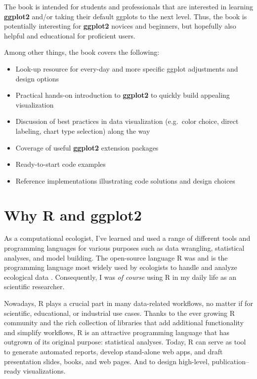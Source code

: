 \documentclass[
]{krantz}
\providecommand{\tightlist}{%
  \setlength{\itemsep}{0pt}\setlength{\parskip}{0pt}}
\begin{document}
The book is intended for students and professionals that are interested in learning \textbf{ggplot2} and/or taking their default ggplots to the next level. Thus, the book is potentially interesting for \textbf{ggplot2} novices and beginners, but hopefully also helpful and educational for proficient users.

Among other things, the book covers the following:

\begin{itemize}
\tightlist
\item
  Look-up resource for every-day and more specific ggplot adjustments and design options
\item
  Practical hands-on introduction to \textbf{ggplot2} to quickly build appealing visualization
\item
  Discussion of best practices in data visualization (e.g.~color choice, direct labeling, chart type selection) along the way
\item
  Coverage of useful \textbf{ggplot2} extension packages
\item
  Ready-to-start code examples
\item
  Reference implementations illustrating code solutions and design choices
\end{itemize}

\hypertarget{why-r-and-ggplot2}{%
\section*{\texorpdfstring{Why R and \textbf{ggplot2}}{Why R and ggplot2}}\label{why-r-and-ggplot2}}


As a computational ecologist, I've learned and used a range of different tools and programming languages for various purposes such as data wrangling, statistical analyses, and model building. The open-source language R was and is the programming language most widely used by ecologists to handle and analyze ecological data \citep{sciaini2018}. Consequently, I was \emph{of course} using R in my daily life as an scientific researcher.

Nowadays, R plays a crucial part in many data-related workflows, no matter if for scientific, educational, or industrial use cases. Thanks to the ever growing R community and the rich collection of libraries that add additional functionality and simplify workflows, R is an attractive programming language that has outgrown of its original purpose: statistical analyses. Today, R can serve as tool to generate automated reports, develop stand-alone web apps, and draft presentation slides, books, and web pages. And to design high-level, publication--ready visualizations.
\end{document}
